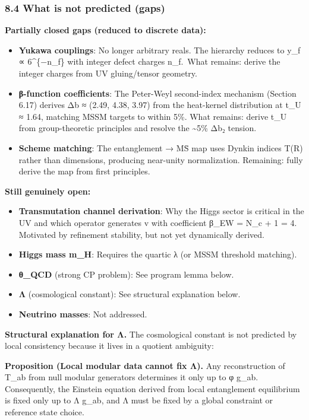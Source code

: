 \documentclass[11pt,a4paper]{article}
\theoremstyle{remark}
\providecommand{\tightlist}{%
  \setlength{\itemsep}{0pt}\setlength{\parskip}{0pt}}
\begin{document}
\subsubsection{8.4 What is not predicted (gaps)}\label{what-is-not-predicted-gaps}

\textbf{Partially closed gaps (reduced to discrete data):}

\begin{itemize}
\tightlist
\item
  \textbf{Yukawa couplings}: No longer arbitrary reals. The hierarchy reduces to
  y\_f ∝ 6\^{}\{−n\_f\} with integer defect charges n\_f.~What remains: derive the
  integer charges from UV gluing/tensor geometry.
\item
  \textbf{β-function coefficients}: The Peter-Weyl second-index mechanism (Section 6.17)
  derives Δb ≈ (2.49, 4.38, 3.97) from the heat-kernel distribution at t\_U ≈ 1.64,
  matching MSSM targets to within 5\%. What remains: derive t\_U from group-theoretic
  principles and resolve the \textasciitilde5\% Δb₂ tension.
\item
  \textbf{Scheme matching}: The entanglement → MS̄ map uses Dynkin indices T(R) rather than dimensions, producing near-unity normalization. Remaining: fully derive the map from first principles.
\end{itemize}

\textbf{Still genuinely open:}

\begin{itemize}
\tightlist
\item
  \textbf{Transmutation channel derivation}: Why the Higgs sector is critical in
  the UV and which operator generates v with coefficient β\_EW = N\_c + 1 = 4.
  Motivated by refinement stability, but not yet dynamically derived.
\item
  \textbf{Higgs mass m\_H}: Requires the quartic λ (or MSSM threshold matching).
\item
  \textbf{θ\_QCD} (strong CP problem): See program lemma below.
\item
  \textbf{Λ} (cosmological constant): See structural explanation below.
\item
  \textbf{Neutrino masses}: Not addressed.
\end{itemize}

\textbf{Structural explanation for Λ.} The cosmological constant is not predicted by local consistency because it lives in a quotient ambiguity:

\textbf{Proposition (Local modular data cannot fix Λ).} Any reconstruction of T\_ab from null modular generators determines it only up to φ g\_ab. Consequently, the Einstein equation derived from local entanglement equilibrium is fixed only up to Λ g\_ab, and Λ must be fixed by a global constraint or reference state choice.
\end{document}
